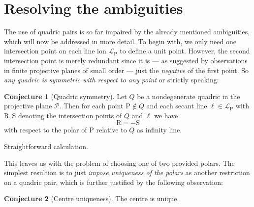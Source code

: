 \documentclass[12pt,english,paper=a4,DIV=12,headings=small,numbers=noenddot,parskip=half]{scrartcl}
\theoremstyle{definition}
\newtheorem{conj}{Conjecture}
\renewenvironment{proof}{{\itshape Idea of proof.}}{}
\begin{document}
\section{Resolving the ambiguities}
The use of quadric pairs is so far impaired by the already mentioned ambiguities, which will now be addressed in more detail. To begin with, we only need one intersection point on each line ion $\mathscr{L}_\mathrm{P}$ to define a unit point. However, the second intersection point is merely redundant since it is --- as suggested by observations in finite projective planes of small order --- just the \emph{negative} of the first point. So \emph{any quadric is symmetric with respect to any point} or strictly speaking:

\begin{conj}[Quadric symmetry]
Let $Q$ be a nondegenerate quadric in the projective plane $\mathscr{P}$. Then for each point $\mathrm{P}\notin Q$ and each secant line $\ell\in\mathscr{L}_\mathrm{P}$ with $\mathrm{R}, \mathrm{S}$ denoting the intersection points of $Q$ and $\ell$ we have
\begin{equation*}
\mathrm{R} = -\mathrm{S}
\end{equation*}
with respect to the polar of $\mathrm{P}$ relative to $Q$ as infinity line.

\begin{proof}
Straightforward calculation.
\end{proof}
\end{conj}

This leaves us with the problem of choosing one of two provided polars. The simplest resultion is to just \emph{impose uniqueness of the polars} as another restriction on a quadric pair, which is further justified by the following observation:

\begin{conj}[Centre uniqueness]
The centre is unique.
\end{conj}
\end{document}
